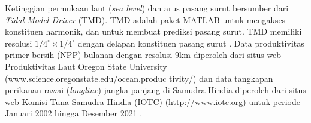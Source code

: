\begin{spacing}{1.5}
	Ketinggian permukaan laut (\textit{sea level}) dan arus pasang surut bersumber dari \textit{Tidal Model Driver }(TMD). TMD adalah paket MATLAB untuk mengakses konstituen harmonik, dan untuk membuat prediksi pasang surut. TMD memiliki resolusi $1/4^\circ \times 1/4^\circ$ dengan delapan konstituen pasang surut \cite{padman2005tide}. Data produktivitas primer bersih (NPP) bulanan dengan resolusi 9km diperoleh dari situs web Produktivitas Laut Oregon State University (www.science.oregonstate.edu/ocean.produc tivity/) dan data tangkapan perikanan rawai (\textit{longline}) jangka panjang di Samudra Hindia diperoleh dari situs web Komisi Tuna Samudra Hindia (IOTC) (http://www.iotc.org) untuk periode Januari 2002 hingga Desember 2021 \cite{Lan2013}.
	
	

\end{spacing}
